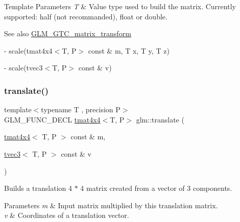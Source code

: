 \begin{DoxyTemplParams}{Template Parameters}
{\em T} & Value type used to build the matrix. Currently supported\+: half (not recommanded), float or double. \\
\hline
\end{DoxyTemplParams}
\begin{DoxySeeAlso}{See also}
\hyperlink{group__gtc__matrix__transform}{G\+L\+M\+\_\+\+G\+T\+C\+\_\+matrix\+\_\+transform} 

-\/ scale(tmat4x4$<$\+T, P$>$ const \& m, T x, T y, T z) 

-\/ scale(tvec3$<$\+T, P$>$ const \& v) 
\end{DoxySeeAlso}
\mbox{\label{group__gtc__matrix__transform_gaee134ab77c6c5548a6ebf4e8e476c6ed}} 
\subsubsection{\texorpdfstring{translate()}{translate()}}
{\footnotesize\ttfamily template$<$typename T , precision P$>$ \\
G\+L\+M\+\_\+\+F\+U\+N\+C\+\_\+\+D\+E\+CL \hyperlink{structglm_1_1tmat4x4}{tmat4x4}$<$T, P$>$ glm\+::translate (\begin{DoxyParamCaption}\item[{\hyperlink{structglm_1_1tmat4x4}{tmat4x4}$<$ T, P $>$ const \&}]{m,  }\item[{\hyperlink{structglm_1_1tvec3}{tvec3}$<$ T, P $>$ const \&}]{v }\end{DoxyParamCaption})}

Builds a translation 4 $\ast$ 4 matrix created from a vector of 3 components.


\begin{DoxyParams}{Parameters}
{\em m} & Input matrix multiplied by this translation matrix. \\
\hline
{\em v} & Coordinates of a translation vector. \\
\hline
\end{DoxyParams}

